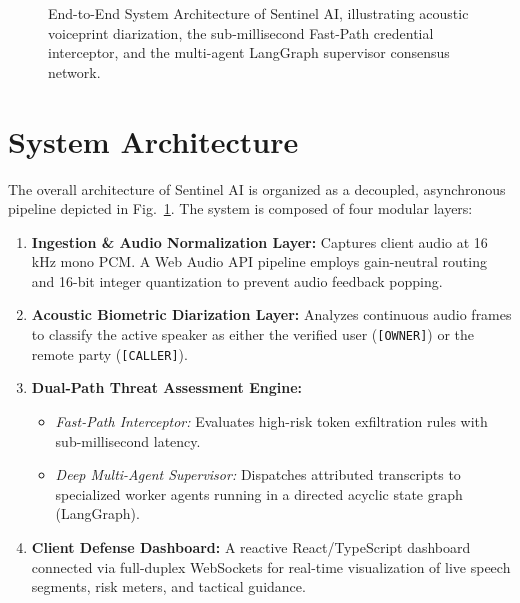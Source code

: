 \documentclass[conference]{IEEEtran}
\begin{document}
\begin{figure}[!t]
{
}
\caption{End-to-End System Architecture of Sentinel AI, illustrating acoustic voiceprint diarization, the sub-millisecond Fast-Path credential interceptor, and the multi-agent LangGraph supervisor consensus network.}
\label{fig:arch}
\end{figure}

\section{System Architecture}
The overall architecture of Sentinel AI is organized as a decoupled, asynchronous pipeline depicted in Fig.~\ref{fig:arch}. The system is composed of four modular layers:
\begin{enumerate}
    \item \textbf{Ingestion \& Audio Normalization Layer:} Captures client audio at 16\,kHz mono PCM. A Web Audio API pipeline employs gain-neutral routing and 16-bit integer quantization to prevent audio feedback popping.
    \item \textbf{Acoustic Biometric Diarization Layer:} Analyzes continuous audio frames to classify the active speaker as either the verified user (\texttt{[OWNER]}) or the remote party (\texttt{[CALLER]}).
    \item \textbf{Dual-Path Threat Assessment Engine:}
    \begin{itemize}
        \item \textit{Fast-Path Interceptor:} Evaluates high-risk token exfiltration rules with sub-millisecond latency.
        \item \textit{Deep Multi-Agent Supervisor:} Dispatches attributed transcripts to specialized worker agents running in a directed acyclic state graph (LangGraph).
    \end{itemize}
    \item \textbf{Client Defense Dashboard:} A reactive React/TypeScript dashboard connected via full-duplex WebSockets for real-time visualization of live speech segments, risk meters, and tactical guidance.
\end{enumerate}
\end{document}
